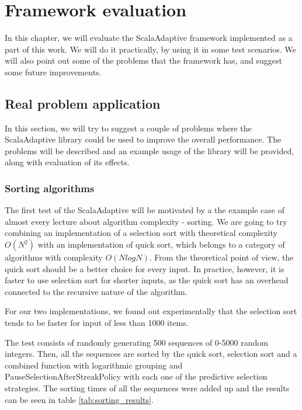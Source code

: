 \chapter{Framework evaluation}

In this chapter, we will evaluate the ScalaAdaptive framework implemented as a part of this work. We will do it practically, by using it in some test scenarios. We will also point out some of the problems that the framework has, and suggest some future improvements.

\section{Real problem application}

In this section, we will try to suggest a couple of problems where the ScalaAdaptive library could be used to improve the overall performance. The problems will be described and an example usage of the library will be provided, along with evaluation of its effects.

\subsection{Sorting algorithms}

The first test of the ScalaAdaptive will be motivated by a the example case of almost every lecture about algorithm complexity - sorting. We are going to try combining an implementation of a selection sort with theoretical complexity $O(N^2)$ with an implementation of quick sort, which belongs to a category of algorithms with complexity $O(N logN)$. From the theoretical point of view, the quick sort should be a better choice for every input. In practice, however, it is faster to use selection sort for shorter inputs, as the quick sort has an overhead connected to the recursive nature of the algorithm.

For our two implementations, we found out experimentally that the selection sort tends to be faster for input of less than 1000 items.

The test consists of randomly generating 500 sequences of 0-5000 random integers. Then, all the sequences are sorted by the quick sort, selection sort and a combined function with logarithmic grouping and PauseSelectionAfterStreakPolicy with each one of the predictive selection strategies. The sorting times of all the sequences were added up and the results can be seen in table \ref{tab:sorting_results}.

